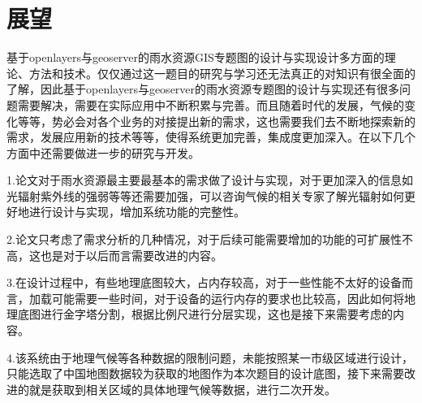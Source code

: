 \section{展望}

基于openlayers与geoserver的雨水资源GIS专题图的设计与实现设计多方面的理论、方法和技术。仅仅通过这一题目的研究与学习还无法真正的对知识有很全面的了解，因此基于openlayers与geoserver的雨水资源专题图的设计与实现还有很多问题需要解决，需要在实际应用中不断积累与完善。而且随着时代的发展，气候的变化等等，势必会对各个业务的对接提出新的需求，这也需要我们去不断地探索新的需求，发展应用新的技术等等，使得系统更加完善，集成度更加深入。在以下几个方面中还需要做进一步的研究与开发。

1.论文对于雨水资源最主要最基本的需求做了设计与实现，对于更加深入的信息如光辐射紫外线的强弱等等还需要加强，可以咨询气候的相关专家了解光辐射如何更好地进行设计与实现，增加系统功能的完整性。

2.论文只考虑了需求分析的几种情况，对于后续可能需要增加的功能的可扩展性不高，这也是对于以后而言需要改进的内容。

3.在设计过程中，有些地理底图较大，占内存较高，对于一些性能不太好的设备而言，加载可能需要一些时间，对于设备的运行内存的要求也比较高，因此如何将地理底图进行金字塔分割，根据比例尺进行分层实现，这也是接下来需要考虑的内容。

4.该系统由于地理气候等各种数据的限制问题，未能按照某一市级区域进行设计，只能选取了中国地图数据较为获取的地图作为本次题目的设计底图，接下来需要改进的就是获取到相关区域的具体地理气候等数据，进行二次开发。




